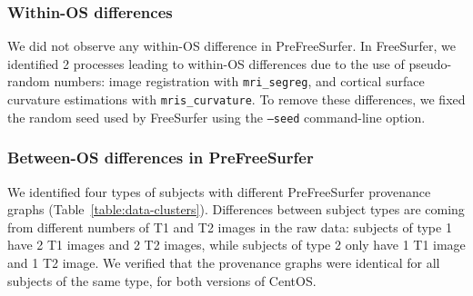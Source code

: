 \documentclass[a4paper,num-refs]{oup-contemporary}
\begin{document}


\subsubsection{Within-OS differences}

We did not observe any within-OS difference in PreFreeSurfer. In
FreeSurfer, we identified 2 processes leading to within-OS differences due
to the use of pseudo-random numbers: image registration with
\texttt{mri\_segreg}, and cortical surface curvature estimations with
\texttt{mris\_curvature}. To remove these differences, we fixed the random
seed used by FreeSurfer using the \texttt{--seed} command-line option. 

\subsubsection{Between-OS differences in PreFreeSurfer}

We identified four types of subjects with different PreFreeSurfer
provenance graphs (Table~\ref{table:data-clusters}). Differences between
subject types are coming from different  numbers of T1 and T2 images in the
raw data: subjects of type 1 have 2 T1 images and 2 T2 images, while
subjects of type 2 only have 1 T1 image and 1 T2 image. We verified that
the provenance graphs were identical for all subjects of the same type, for
both versions of CentOS.
\end{document}
